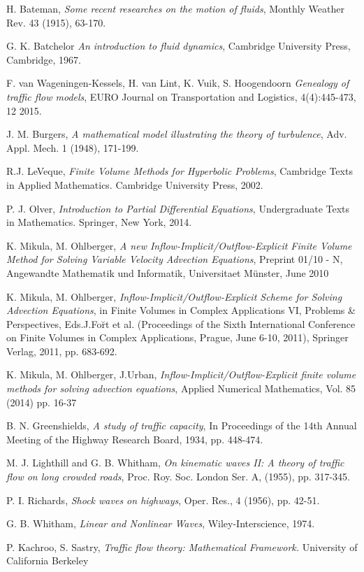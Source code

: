 \documentclass[a4paper,12pt,twoside]{report}%
\begin{document}
\begin{thebibliography}{9}
	 {\sc H. Bateman},
	{\em Some recent researches on the motion of fluids}, Monthly Weather Rev. 43 (1915), 63-170.
	
	 {\sc G. K. Batchelor}
	{\em An introduction to fluid dynamics}, Cambridge University Press, Cambridge, 1967.
	
	 {\sc F. van Wageningen-Kessels, H. van Lint, K. Vuik, S. Hoogendoorn}
	{\em Genealogy of traffic flow models}, EURO Journal on Transportation and Logistics, 4(4):445-473, 12 2015.
	
	 {\sc J. M. Burgers},
	{\em A mathematical model illustrating the theory of turbulence}, Adv. Appl. Mech. 1 (1948), 171-199.
	
	 {\sc R.J. LeVeque}, 
	{\em Finite Volume Methods for Hyperbolic Problems}, Cambridge Texts in Applied Mathematics. Cambridge University Press, 2002.
	
	 {\sc P. J. Olver}, 
	{\em Introduction to Partial Differential Equations}, Undergraduate Texts in Mathematics. Springer, New York, 2014.
	
	 {\sc K. Mikula, M. Ohlberger}, 
	{\em A new Inflow-Implicit/Outflow-Explicit Finite Volume Method for Solving Variable Velocity Advection Equations}, Preprint 01/10 - N, Angewandte Mathematik und Informatik, Universitaet M\"{u}nster, June 2010
	
	 {\sc K. Mikula, M. Ohlberger},
	{\em Inflow-Implicit/Outflow-Explicit Scheme for Solving Advection Equations}, in Finite Volumes in Complex Applications VI, Problems \& Perspectives, Eds.J.Fo\u{r}t et al. (Proceedings of the Sixth International Conference on Finite Volumes in Complex Applications, Prague, June 6-10, 2011), Springer Verlag, 2011, pp. 683-692.
	
	
	 {\sc K. Mikula, M. Ohlberger, J.Urban}, 
	{\em Inflow-Implicit/Outflow-Explicit finite volume methods for solving advection equations}, Applied Numerical Mathematics, Vol. 85 (2014) pp. 16-37
	
	 {\sc B. N. Greenshields},
	{\em A study of traffic capacity}, In Proceedings of the 14th Annual Meeting of the Highway Research Board, 1934, pp. 448-474.
	
	 {\sc M. J. Lighthill and G. B. Whitham},
	{\em On kinematic waves II: A theory of traffic flow on long crowded roads}, Proc. Roy. Soc. London Ser. A, (1955), pp. 317-345.
	
	 {\sc P. I. Richards},
	{\em Shock waves on highways}, Oper. Res., 4 (1956), pp. 42-51.
	
	 {\sc G. B. Whitham}, 
	{\em Linear and Nonlinear Waves}, Wiley-Interscience, 1974.
	
	 {\sc P. Kachroo, S. Sastry},
	{\em Traffic flow theory: Mathematical Framework.} University of California Berkeley
	
\end{thebibliography} 
\end{document}

